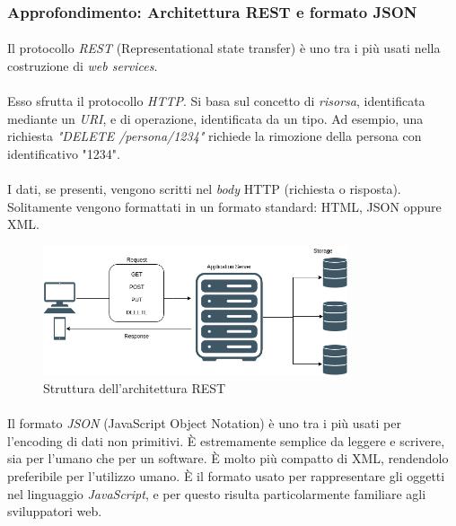 \documentclass[11pt,a4paper,english]{article}
\begin{document}
\subsubsection{Approfondimento: Architettura REST e formato JSON}

\paragraph{} Il protocollo \emph{REST} (Representational state transfer) è uno tra i più usati nella costruzione di \emph{web services}. 

\paragraph{} Esso sfrutta il protocollo \emph{HTTP}. Si basa sul concetto di \emph{risorsa}, identificata mediante un \emph{URI}, e di operazione, identificata da un tipo. Ad esempio, una richiesta \emph{"DELETE /persona/1234"} richiede la rimozione della persona con identificativo "1234".

\paragraph{} I dati, se presenti, vengono scritti nel \emph{body} HTTP (richiesta o risposta). Solitamente vengono formattati in un formato standard: HTML, JSON oppure XML. 

\begin{figure}[H]
    \centering
    \includegraphics[width=0.8\textwidth]{img/rest.png}
    \caption{Struttura dell'architettura REST}
\end{figure}

\paragraph{} Il formato \emph{JSON} (JavaScript Object Notation) è uno tra i più usati per l'encoding di dati non primitivi. È estremamente semplice da leggere e scrivere, sia per l'umano che per un software. È molto più compatto di XML, rendendolo preferibile per l'utilizzo umano. È il formato usato per rappresentare gli oggetti nel linguaggio \emph{JavaScript}, e per questo risulta particolarmente familiare agli sviluppatori web. 
\end{document}
